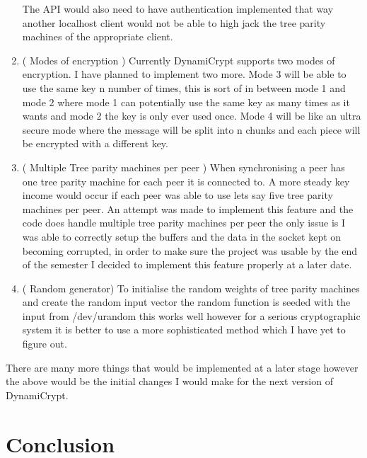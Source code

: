 \begin{enumerate}
	The API would also need to have authentication implemented that way another localhost client would not be able to high jack the tree parity machines of the appropriate client.
	\item ( Modes of encryption ) Currently DynamiCrypt supports two modes of encryption. I have planned to implement two more. Mode 3 will be able to use the same key n number of times, this is sort of in between mode 1 and mode 2 where mode 1 can potentially use the same key as many times as it wants and mode 2 the key is only ever used once. Mode 4 will be like an ultra secure mode where the message will be split into n chunks and each piece will be encrypted with a different key.
	\item ( Multiple Tree parity machines per peer ) When synchronising a peer has one tree parity machine for each peer it is connected to. A more steady key income would occur if each peer was able to use lets say five tree parity machines per peer. An attempt was made to implement this feature and the code does handle multiple tree parity machines per peer the only issue is I was able to correctly setup the buffers and the data in the socket kept on becoming corrupted, in order to make sure the project was usable by the end of the semester I decided to implement this feature properly at a later date. 
	\item ( Random generator) To initialise the random weights of tree parity machines and create the random input vector the random function is seeded with the input from /dev/urandom this works well however for a serious cryptographic system it is better to use a more sophisticated method which I have yet to figure out.
\end{enumerate}
	There are many more things that would be implemented at a later stage however the above would be the initial changes I would make for the next version of DynamiCrypt.
	
\section{Conclusion}

